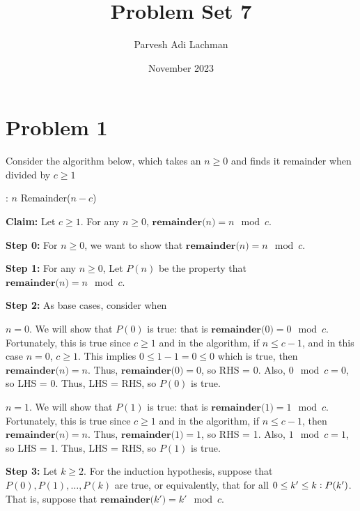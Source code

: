 \documentclass{article}
\title{Problem Set 7}
\author{Parvesh Adi Lachman}
\date{November 2023}
\begin{document}
\maketitle
\section{Problem 1}

Consider the algorithm below, which takes an $n\geq 0$ and finds it remainder when divided by $c\geq 1$

\vspace{15pt}

\begin{algorithmic}
:
\State \Return $n$
\Else
\State \Return Remainder($n-c$)
\EndIf
\EndFunction
\end{algorithmic}

\vspace{10pt}


\noindent\textbf{Claim:} Let $c\geq 1$. For any $n\geq 0$, $\textbf{remainder($n$)}=n\mod c$.
\vspace{10pt}


\textbf{Step 0:} For $n\geq 0$, we want to show that $\textbf{remainder($n$)}=n\mod c$. 
\vspace{15pt}

\textbf{Step 1:} For any $n\geq 0$, Let $P(n)$ be the property that $\textbf{remainder($n$)}=n\mod c$.
\vspace{15pt}

\textbf{Step 2:} As base cases, consider when\vspace{10pt}


$n=0$. We will show that $P(0)$ is true: that is $\textbf{remainder($0$)}=0\mod c$. Fortunately, this is true since $c\geq 1$ and in the algorithm, if $n\leq c-1$, and in this case $n=0$, $c\geq1$. This implies $0\leq 1-1=0\leq0$ which is true, then $\textbf{remainder($n$)}=n$. Thus, $\textbf{remainder($0$)}=0$, so RHS = 0. Also, $0\mod c=0$, so LHS = 0. Thus, LHS = RHS, so $P(0)$ is true.
\vspace{10pt}

$n=1$. We will show that $P(1)$ is true: that is $\textbf{remainder($1$)}=1\mod c$. Fortunately, this is true since $c\geq 1$ and in the algorithm, if $n\leq c-1$, then $\textbf{remainder($n$)}=n$. Thus, $\textbf{remainder($1$)}=1$, so RHS = 1. Also, $1\mod c=1$, so LHS = 1. Thus, LHS = RHS, so $P(1)$ is true.


\vspace{15pt}
\pagebreak
\textbf{Step 3:} Let $k\geq 2$. For the induction hypothesis, suppose that $P(0),P(1),\ldots,P(k)$ are true, or equivalently, that for all $0\leq k'\leq k\vcentcolon P(k')$. That is, suppose that $\textbf{remainder($k'$)}=k'\mod c$.
\vspace{15pt}
\end{document}
